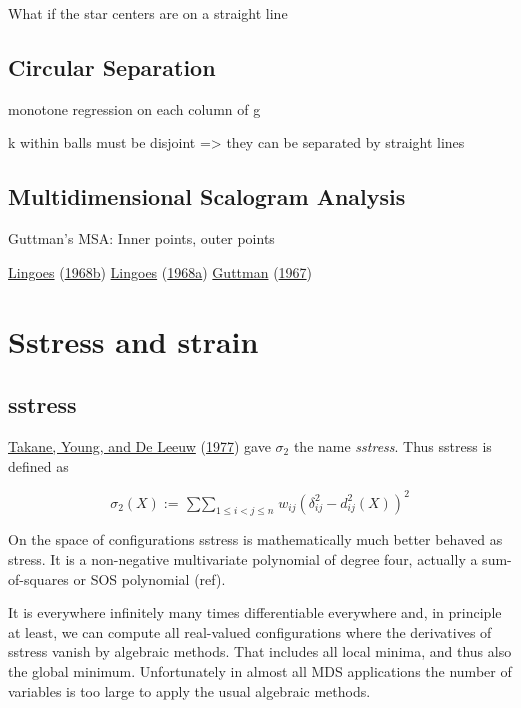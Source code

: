 \documentclass[
  12pt,
]{book}
\theoremstyle{definition}
\theoremstyle{definition}
\theoremstyle{definition}
\theoremstyle{definition}
\theoremstyle{remark}
\begin{document}
What if the star centers are on a straight line

\hypertarget{circular-separation}{%
\section{Circular Separation}\label{circular-separation}}

monotone regression on each column of g

k within balls must be disjoint =\textgreater{} they can be separated by straight
lines

\hypertarget{multidimensional-scalogram-analysis}{%
\section{Multidimensional Scalogram Analysis}\label{multidimensional-scalogram-analysis}}

Guttman's MSA: Inner points, outer points

\protect\hyperlink{ref-lingoes_68a}{Lingoes} (\protect\hyperlink{ref-lingoes_68a}{1968b})
\protect\hyperlink{ref-lingoes_68b}{Lingoes} (\protect\hyperlink{ref-lingoes_68b}{1968a})
\protect\hyperlink{ref-guttman_67}{Guttman} (\protect\hyperlink{ref-guttman_67}{1967})

\hypertarget{ssstr}{%
\chapter{Sstress and strain}\label{ssstr}}

\hypertarget{sstress}{%
\section{sstress}\label{sstress}}

\protect\hyperlink{ref-takane_young_deleeuw_A_77}{Takane, Young, and De Leeuw} (\protect\hyperlink{ref-takane_young_deleeuw_A_77}{1977}) gave \(\sigma_2\) the name \emph{sstress}. Thus sstress is defined as

\[
\sigma_2(X):=\mathop{\sum\sum}_{1\leq i<j\leq n}w_{ij}(\delta_{ij}^2-d_{ij}^2(X))^2
\]

On the space of configurations sstress is mathematically much better behaved as stress. It is a non-negative multivariate polynomial of degree four, actually a sum-of-squares or SOS polynomial (ref).

It is everywhere infinitely many times differentiable everywhere and, in principle at least, we can compute all real-valued configurations where the derivatives of sstress vanish by algebraic methods. That includes all local minima, and thus also the global minimum. Unfortunately in almost all MDS applications the number of variables is too large to apply the usual algebraic methods.
\end{document}
